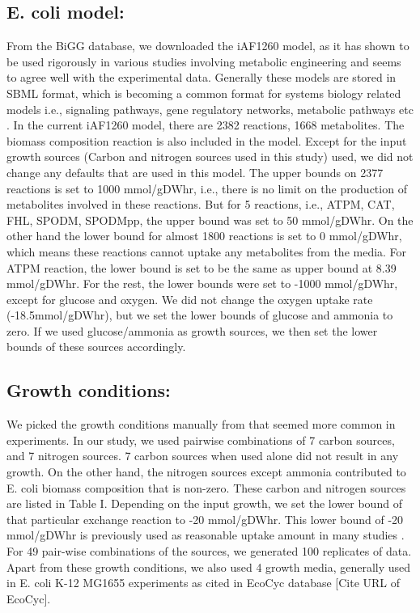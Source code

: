 \documentclass[12pt]{article}
\begin{document}
\subsection*{E. coli model:} 
From the BiGG database, we downloaded the iAF1260 model, as it has shown to be used rigorously in various studies involving metabolic engineering and seems to agree well with the experimental data. Generally these models are stored in SBML format, which is becoming a common format for systems biology related models i.e., signaling pathways, gene regulatory networks, metabolic pathways etc \cite{Huckaetal2003}. In the current iAF1260 model, there are 2382 reactions, 1668 metabolites. The biomass composition reaction is also included in the model. Except for the input growth sources (Carbon and nitrogen sources used in this study) used, we did not change any defaults that are used in this model. The upper bounds on 2377 reactions is set to 1000 mmol/gDWhr, i.e., there is no limit on the production of metabolites involved in these reactions. But for 5 reactions, i.e., ATPM, CAT, FHL, SPODM, SPODMpp, the upper bound was set to 50 mmol/gDWhr. On the other hand the lower bound for almost 1800 reactions is set to 0 mmol/gDWhr, which means these reactions cannot uptake any metabolites from the media. For ATPM reaction, the lower bound is set to be the same as upper bound at 8.39 mmol/gDWhr. For the rest, the lower bounds were set to -1000 mmol/gDWhr, except for glucose and oxygen. We did not change the oxygen uptake rate (-18.5mmol/gDWhr), but we set the lower bounds of glucose and ammonia to zero. If we used glucose/ammonia as growth sources, we then set the lower bounds of these sources accordingly.

\subsection*{Growth conditions:} 
We picked the growth conditions manually from \cite{Feistetal2007} that seemed more common in experiments. In our study, we used pairwise combinations of 7 carbon sources, and 7 nitrogen sources. 7 carbon sources when used alone did not result in any growth. On the other hand, the nitrogen sources except ammonia contributed to E. coli biomass composition that is non-zero. These carbon and nitrogen sources are listed in Table I. Depending on the input growth, we set the lower bound of that particular exchange reaction to -20 mmol/gDWhr. This lower bound of -20 mmol/gDWhr is previously used as reasonable uptake amount in many studies \cite{Feistetal2007}. For 49 pair-wise combinations of the sources, we generated 100 replicates of data. Apart from these growth conditions, we also used 4 growth media, generally used in E. coli K-12 MG1655 experiments as cited in EcoCyc database [Cite URL of EcoCyc].
\end{document}
